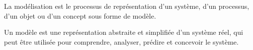 La modélisation est le processus de représentation d'un système, d'un processus, d'un objet ou d'un concept sous forme de modèle. 

Un modèle est une représentation abstraite et simplifiée d'un système réel, qui peut être utilisée pour comprendre, analyser, prédire et concevoir le système.

